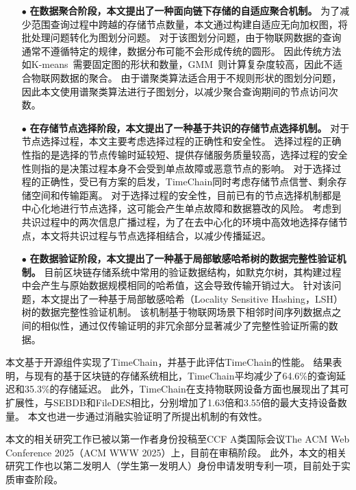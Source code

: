 \begin{itemize}
    \item[$\bullet$] \textbf{在数据聚合阶段，本文提出了一种面向链下存储的自适应聚合机制。}
    为了减少范围查询过程中跨越的存储节点数量，本文通过构建自适应无向加权图，将批处理问题转化为图划分问题。
    对于该图划分问题，由于物联网数据的查询通常不遵循特定的规律，数据分布可能不会形成传统的圆形。
    因此传统方法如K-means~\cite{kanungo2002efficient}需要固定图的形状和数量，GMM~\cite{he2010laplacian}则计算复杂度较高，因此不适合物联网数据的聚合。
    由于谱聚类算法适合用于不规则形状的图划分问题，因此本文使用谱聚类算法进行子图划分，以减少聚合查询期间的节点访问次数。

    \item[$\bullet$] \textbf{在存储节点选择阶段，本文提出了一种基于共识的存储节点选择机制。}
    对于节点选择过程，本文主要考虑选择过程的正确性和安全性。
    选择过程的正确性指的是选择的节点传输时延较短、提供存储服务质量较高，选择过程的安全性则指的是决策过程本身不会受到单点故障或恶意节点的影响。
    对于选择过程的正确性，受已有方案的启发，TimeChain同时考虑存储节点信誉、剩余存储空间和传输距离。
    对于选择过程的安全性，目前已有的节点选择机制都是中心化地进行节点选择，这可能会产生单点故障和数据篡改的风险。
    考虑到共识过程中的两次信息广播过程，为了在去中心化的环境中高效地选择存储节点，本文将共识过程与节点选择相结合，以减少传播延迟。

    \item[$\bullet$] \textbf{在数据验证阶段，本文提出了一种基于局部敏感哈希树的数据完整性验证机制。}
    目前区块链存储系统中常用的验证数据结构，如默克尔树，其构建过程中会产生与原始数据规模相同的哈希值，这会导致传输开销过大。
    针对该问题，本文提出了一种基于局部敏感哈希（Locality Sensitive Hashing，LSH）树的数据完整性验证机制。
    该机制基于物联网场景下相邻时间序列数据点之间的相似性，通过仅传输证明的非冗余部分显著减少了完整性验证所需的数据。
\end{itemize}

本文基于开源组件实现了TimeChain，并基于此评估TimeChain的性能。
结果表明，与现有的基于区块链的存储系统相比，TimeChain平均减少了64.6\%的查询延迟和35.3\%的存储延迟。
此外，TimeChain在支持物联网设备方面也展现出了其可扩展性，与SEBDB和FileDES相比，分别增加了1.63倍和3.55倍的最大支持设备数量。
本文也进一步通过消融实验证明了所提出机制的有效性。

本文的相关研究工作已被以第一作者身份投稿至CCF A类国际会议The ACM Web Conference 2025（ACM WWW 2025）上，目前在审稿阶段。
此外，本文的相关研究工作也以第二发明人（学生第一发明人）身份申请发明专利一项，目前处于实质审查阶段。

